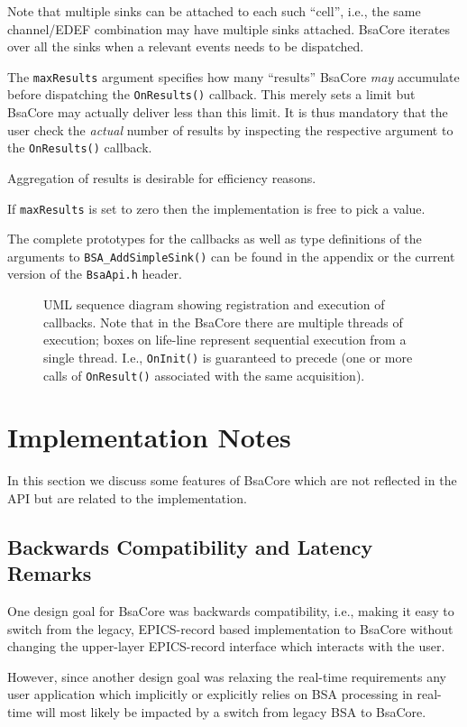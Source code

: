 \documentclass[11pt]{article}
\newcommand{\bsac}{BsaCore}
\newcommand{\bsa} {BSA}
\newcommand{\EDEF}{EDEF}
\newcommand{\cod}[1]{{\tt#1}}
\newcounter{figs}
\newcommand{\fig}[3][0]{
\refstepcounter{figs}
\hfill\resizebox{#2}{!}{
        \rotatebox{#1}{\texttt{[image: \#3]}}}\hspace*{\fill}
}
\begin{document}
Note that multiple sinks can be attached to each such ``cell'', i.e., the same
channel/\EDEF{} combination may have multiple sinks attached. \bsac{} iterates
over all the sinks when a relevant events needs to be dispatched.

The \cod{maxResults} argument specifies how many ``results'' \bsac{} {\em may}
accumulate before dispatching the \cod{OnResults()} callback. This merely
sets a limit but \bsac{} may actually deliver less than this limit. It is
thus mandatory that the user check the {\em actual} number of results
by inspecting the respective argument to the \cod{OnResults()} callback.

Aggregation of results is desirable for efficiency reasons.

If \cod{maxResults} is set to zero then the implementation is free to pick
a value.

The complete prototypes for the callbacks as well as type definitions of the
arguments to \cod{BSA\_AddSimpleSink()} can be found in the appendix or the
current version of the \cod{BsaApi.h} header.

\begin{figure}
\fig{0.9\textwidth}{fig_cbuml.eps}
\label{fig:cbuml}
\caption{UML sequence diagram showing registration and execution of callbacks.
         Note that in the BsaCore there are multiple threads of execution;
         boxes on life-line represent sequential execution from a single thread.         I.e., \cod{OnInit()} is guaranteed to precede (one or more calls of
         \cod{OnResult()} associated with the same acquisition).}
\end{figure}

\section{Implementation Notes}
In this section we discuss some features of \bsac{} which are not reflected
in the API but are related to the implementation.
\subsection{Backwards Compatibility and Latency Remarks}
\label{sec:latency}
One design goal for \bsac{} was backwards compatibility, i.e., making it easy
to switch from the legacy, EPICS-record based implementation to \bsac{} without
changing the upper-layer EPICS-record interface which interacts with the user.

However, since another design goal was relaxing the real-time requirements
any user application which implicitly or explicitly relies on \bsa{} processing
in real-time will most likely be impacted by a switch from legacy \bsa{} to
\bsac{}.
\end{document}
